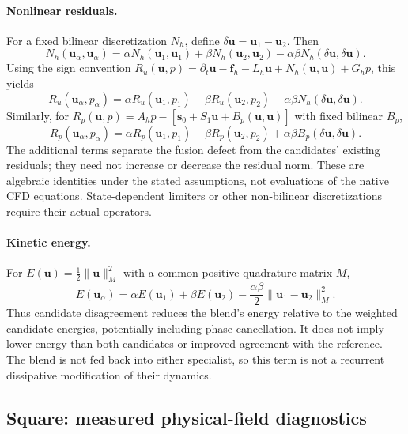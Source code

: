 \paragraph{Nonlinear residuals.}
For a fixed bilinear discretization $N_h$, define
$\delta\bm u=\bm u_1-\bm u_2$. Then
\begin{equation}
N_h(\bm u_\alpha,\bm u_\alpha)
=\alpha N_h(\bm u_1,\bm u_1)+\beta N_h(\bm u_2,\bm u_2)
-\alpha\beta N_h(\delta\bm u,\delta\bm u).
\end{equation}
Using the sign convention
$R_u(\bm u,p)=\partial_t\bm u-\bm f_h-L_h\bm u
+N_h(\bm u,\bm u)+G_hp$, this yields
\begin{equation}
R_u(\bm u_\alpha,p_\alpha)
=\alpha R_u(\bm u_1,p_1)+\beta R_u(\bm u_2,p_2)
-\alpha\beta N_h(\delta\bm u,\delta\bm u).
\end{equation}
Similarly, for
$R_p(\bm u,p)=A_hp-[\bm s_0+S_1\bm u+B_p(\bm u,\bm u)]$
with fixed bilinear $B_p$,
\begin{equation}
R_p(\bm u_\alpha,p_\alpha)
=\alpha R_p(\bm u_1,p_1)+\beta R_p(\bm u_2,p_2)
+\alpha\beta B_p(\delta\bm u,\delta\bm u).
\end{equation}
The additional terms separate the fusion defect from the candidates'
existing residuals; they need not increase or decrease the residual
norm. These are algebraic identities under the stated assumptions,
not evaluations of the native CFD equations. State-dependent limiters
or other non-bilinear discretizations require their actual operators.

\paragraph{Kinetic energy.}
For $E(\bm u)=\tfrac12\|\bm u\|_M^2$ with a common positive
quadrature matrix $M$,
\begin{equation}
E(\bm u_\alpha)=\alpha E(\bm u_1)+\beta E(\bm u_2)
-\frac{\alpha\beta}{2}\|\bm u_1-\bm u_2\|_M^2.
\end{equation}
Thus candidate disagreement reduces the blend's energy relative to the
weighted candidate energies, potentially including phase cancellation.
It does not imply lower energy than both candidates or improved agreement
with the reference. The blend is not fed back into either specialist,
so this term is not a recurrent dissipative modification of their dynamics.

\subsection{Square: measured physical-field diagnostics}
\label{app:fusion_measured}

